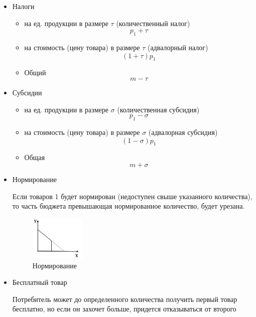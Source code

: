\documentclass[reqno]{article}
\theoremstyle{definition}
\theoremstyle{definition}
\theoremstyle{definition}
\theoremstyle{definition}
\theoremstyle{definition}
\theoremstyle{definition}
\theoremstyle{definition}
\theoremstyle{definition}
\theoremstyle{definition}
\begin{document}
\begin{itemize}
				\item Налоги
				
				\begin{itemize}
					\item на ед. продукции в размере $\tau$ (количественный налог)
						$$p_1 + \tau$$
											
					\item на стоимость (цену товара) в размере $\tau$ (адвалорный налог)
					$$(1+\tau)p_1$$
					
					\item Общий
					$$m-\tau$$
				\end{itemize}
				
				\item Субсидии 
				
				\begin{itemize}
					\item на ед. продукции в размере $\sigma$ (количественная субсидия)
					$$p_1 - \sigma$$
										
					\item на стоимость (цену товара) в размере $\sigma$ (адвалорная субсидия)
					$$(1 - \sigma) p_1$$
					
					\item Общая
					$$m+\sigma$$
				\end{itemize}
			
				\item Нормирование
				
				Если товаров 1 будет нормирован (недоступен свыше указанного количества), то часть бюджета превышающая нормированное количество, будет урезана.
				
				\begin{figure}[h!]
					\centering
					\includegraphics[width=0.25\textwidth]{Линия_бюджета_нормирование}
					\caption{Нормирование}
				\end{figure}
				
				\item Бесплатный товар
				
				Потребитель может до определенного количества получить первый товар бесплатно, но если он захочет больше, придется отказываться от второго
				

\end{itemize}
\end{document}
